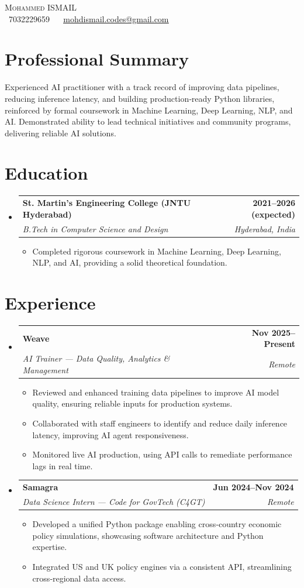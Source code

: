 \documentclass[letterpaper,11pt]{article}
\makeatletter
\newcommand{\resumeItem}[1]{\item\small{{#1 \vspace{-2pt}}}}
\newcommand{\resumeSubheading}[4]{%
  \vspace{-2pt}\item
  \begin{tabular*}{1.0\textwidth}[t]{l@{\extracolsep{\fill}}r}
    \textbf{#1} & \textbf{\small #2} \\
    \textit{\small #3} & \textit{\small #4} \\
  \end{tabular*}\vspace{-7pt}
}
\newcommand{\resumeSubHeadingListStart}{\begin{itemize}[leftmargin=0.0in,label={}]}
\newcommand{\resumeSubHeadingListEnd}{\end{itemize}}
\newcommand{\resumeItemListStart}{\begin{itemize}}
\newcommand{\resumeItemListEnd}{\end{itemize}\vspace{-5pt}}
\makeatother
\begin{document}
\begin{center}
{\Huge \scshape Mohammed ISMAIL} \\ \vspace{2pt}
\small \raisebox{-0.1\height}\faPhone\ 7032229659 ~ \raisebox{-0.2\height}\faEnvelope\ \href{mailto:mohdismail.codes@gmail.com}{\underline{mohdismail.codes@gmail.com}} \\ \vspace{2pt}
\vspace{-8pt}
\end{center}
\section{Professional Summary}
Experienced AI practitioner with a track record of improving data pipelines, reducing inference latency, and building production‑ready Python libraries, reinforced by formal coursework in Machine Learning, Deep Learning, NLP, and AI. Demonstrated ability to lead technical initiatives and community programs, delivering reliable AI solutions.
\section{Education}
\resumeSubHeadingListStart
\resumeSubheading{St. Martin's Engineering College (JNTU Hyderabad)}{2021–2026 (expected)}{B.Tech in Computer Science and Design}{Hyderabad, India}
\resumeItemListStart
  \resumeItem{Completed rigorous coursework in Machine Learning, Deep Learning, NLP, and AI, providing a solid theoretical foundation.}
\resumeItemListEnd
\resumeSubHeadingListEnd
\section{Experience}
\resumeSubHeadingListStart
\resumeSubheading{Weave}{Nov 2025–Present}{AI Trainer — Data Quality, Analytics \& Management}{Remote}
\resumeItemListStart
  \resumeItem{Reviewed and enhanced training data pipelines to improve AI model quality, ensuring reliable inputs for production systems.}
  \resumeItem{Collaborated with staff engineers to identify and reduce daily inference latency, improving AI agent responsiveness.}
  \resumeItem{Monitored live AI production, using API calls to remediate performance lags in real time.}
\resumeItemListEnd
\resumeSubheading{Samagra}{Jun 2024–Nov 2024}{Data Science Intern — Code for GovTech (C4GT)}{Remote}
\resumeItemListStart
  \resumeItem{Developed a unified Python package enabling cross‑country economic policy simulations, showcasing software architecture and Python expertise.}
  \resumeItem{Integrated US and UK policy engines via a consistent API, streamlining cross‑regional data access.}
\resumeItemListEnd
\resumeSubHeadingListEnd
\end{document}
